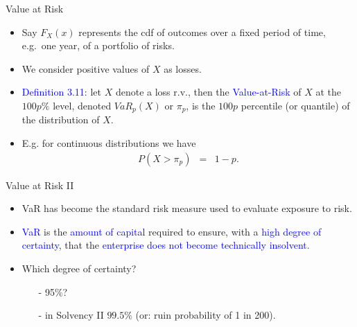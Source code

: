 \documentclass{beamer}
\begin{document}
\begin{frame}{Value at Risk}
\begin{itemize}
\item Say $F_X(x)$ represents the cdf of outcomes over a fixed period of time, e.g.\ one year, of a portfolio of risks.
\vspace{0.3cm}
\item We consider positive values of $X$ as losses.
\vspace{0.3cm}
\item \textcolor{blue}{Definition 3.11}: let $X$ denote a loss r.v., then the \textcolor{blue}{Value-at-Risk} of $X$ at the $100p\%$ level, denoted $VaR_p(X)$ or $\pi_p$, is the $100p$ percentile (or quantile) of the distribution of $X$.
\vspace{0.3cm}
\item E.g. for continuous distributions we have
\begin{eqnarray*}
P(X> \pi_p) &=& 1-p.
\end{eqnarray*}
\end{itemize}
\end{frame}

\begin{frame}{Value at Risk II}
\begin{itemize}
\item VaR has become the standard risk measure used to evaluate exposure to risk.
\vspace{0.3cm}
\item \textcolor{blue}{VaR} is the \textcolor{blue}{amount of capital} required to ensure, with a \textcolor{blue}{high degree of certainty}, that the \textcolor{blue}{enterprise does not become technically insolvent}.
\vspace{0.3cm}
\item Which degree of certainty?
\vspace{0.3cm}
\begin{itemize}
\item[-] 95$\%$?
\vspace{0.3cm}
\item[-] in Solvency II $99.5\%$ (or: ruin probability of 1 in 200).
\end{itemize}
\vspace{0.3cm}
\end{itemize}
\end{frame}
\end{document}
